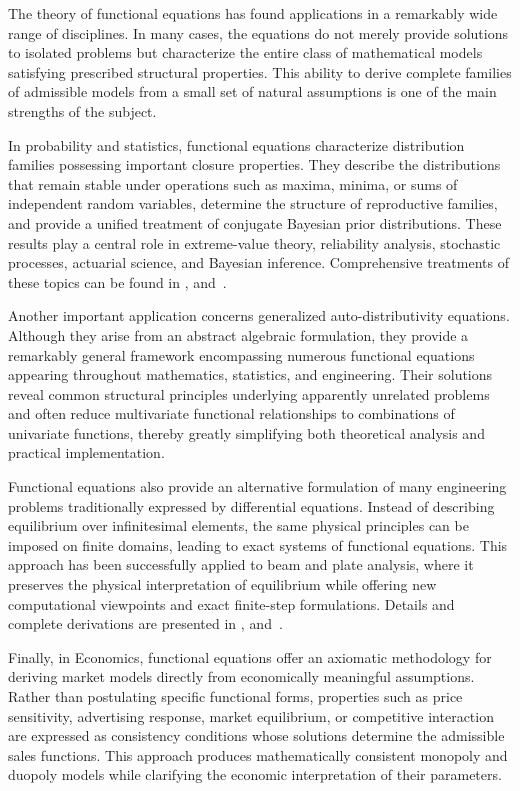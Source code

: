 The theory of functional equations has found applications in a remarkably wide range of disciplines. In many cases, the equations do not merely provide solutions to isolated problems but characterize the entire class of mathematical models satisfying prescribed structural properties. This ability to derive complete families of admissible models from a small set of natural assumptions is one of the main strengths of the subject.

In probability and statistics, functional equations characterize distribution families possessing important closure properties. They describe the distributions that remain stable under operations such as maxima, minima, or sums of independent random variables, determine the structure of reproductive families, and provide a unified treatment of conjugate Bayesian prior distributions. These results play a central role in extreme-value theory, reliability analysis, stochastic processes, actuarial science, and Bayesian inference. Comprehensive treatments of these topics can be found in \cite{castillo2004functional}, \cite{castillo1992functional} and~\cite{CastilloRuiz1993}.

Another important application concerns generalized auto-distributivity equations. Although they arise from an abstract algebraic formulation, they provide a remarkably general framework encompassing numerous functional equations appearing throughout mathematics, statistics, and engineering. Their solutions reveal common structural principles underlying apparently unrelated problems and often reduce multivariate functional relationships to combinations of univariate functions, thereby greatly simplifying both theoretical analysis and practical implementation.

Functional equations also provide an alternative formulation of many engineering problems traditionally expressed by differential equations. Instead of describing equilibrium over infinitesimal elements, the same physical principles can be imposed on finite domains, leading to exact systems of functional equations. This approach has been successfully applied to beam and plate analysis, where it preserves the physical interpretation of equilibrium while offering new computational viewpoints and exact finite-step formulations. Details and complete derivations are presented in \cite{castillo2004functional}, \cite{castillo1992functional} and~\cite{CastilloRuiz1993}.

Finally, in Economics, functional equations offer an axiomatic methodology for deriving market models directly from economically meaningful assumptions. Rather than postulating specific functional forms, properties such as price sensitivity, advertising response, market equilibrium, or competitive interaction are expressed as consistency conditions whose solutions determine the admissible sales functions. This approach produces mathematically consistent monopoly and duopoly models while clarifying the economic interpretation of their parameters.


